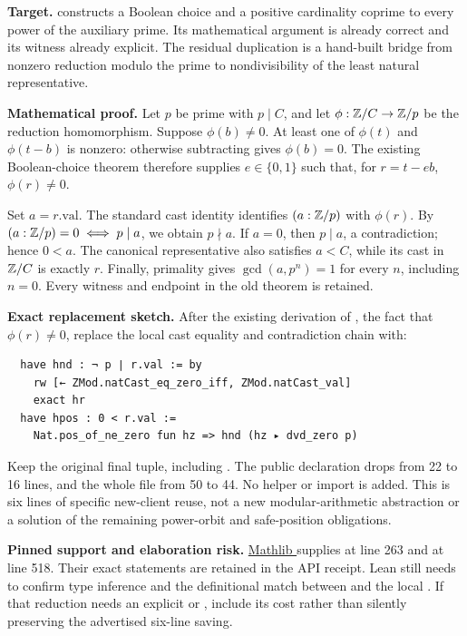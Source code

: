 \textbf{Target.}  constructs a Boolean choice and a positive cardinality coprime to every power of the auxiliary prime. Its mathematical argument is already correct and its witness already explicit. The residual duplication is a hand-built bridge from nonzero reduction modulo the prime to nondivisibility of the least natural representative.

\textbf{Mathematical proof.} Let \(p\) be prime with \(p\mid C\), and let \(\phi:\mathbb Z/C\to\mathbb Z/p\) be the reduction homomorphism. Suppose \(\phi(b)\ne0\). At least one of \(\phi(t)\) and \(\phi(t-b)\) is nonzero: otherwise subtracting gives \(\phi(b)=0\). The existing Boolean-choice theorem therefore supplies \(e\in\{0,1\}\) such that, for \(r=t-eb\), \(\phi(r)\ne0\).

Set \(a=r.\mathrm{val}\). The standard cast identity identifies \((a:\mathbb Z/p)\) with \(\phi(r)\). By \((a:\mathbb Z/p)=0\iff p\mid a\), we obtain \(p\nmid a\). If \(a=0\), then \(p\mid a\), a contradiction; hence \(0<a\). The canonical representative also satisfies \(a<C\), while its cast in \(\mathbb Z/C\) is exactly \(r\). Finally, primality gives \(\gcd(a,p^n)=1\) for every \(n\), including \(n=0\). Every witness and endpoint in the old theorem is retained.

\textbf{Exact replacement sketch.} After the existing derivation of , the fact that \(\phi(r)\ne0\), replace the local cast equality and contradiction chain with:
\begin{lstlisting}
  have hnd : ¬ p ∣ r.val := by
    rw [← ZMod.natCast_eq_zero_iff, ZMod.natCast_val]
    exact hr
  have hpos : 0 < r.val :=
    Nat.pos_of_ne_zero fun hz => hnd (hz ▸ dvd_zero p)
\end{lstlisting}
Keep the original final tuple, including . The public declaration drops from 22 to 16 lines, and the whole file from 50 to 44. No helper or import is added. This is six lines of specific new-client reuse, not a new modular-arithmetic abstraction or a solution of the remaining power-orbit and safe-position obligations.

\textbf{Pinned support and elaboration risk.} \href{https://github.com/leanprover-community/mathlib4/blob/81a5d257c8e410db227a6665ed08f64fea08e997/Mathlib/Data/ZMod/Basic.lean}{Mathlib } supplies  at line 263 and  at line 518. Their exact statements are retained in the API receipt. Lean still needs to confirm type inference and the definitional match between  and the local . If that reduction needs an explicit  or , include its cost rather than silently preserving the advertised six-line saving.

